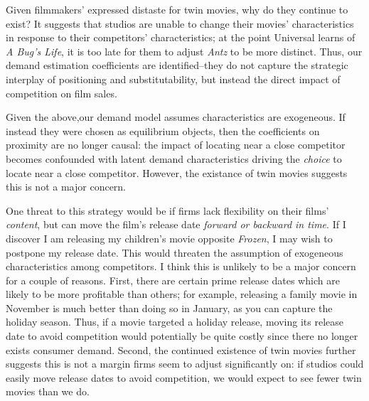 \documentclass{article}
\begin{document}
Given filmmakers' expressed distaste for twin movies, why do they continue to exist? It suggests that studios are unable to change their movies' characteristics in response to their competitors' characteristics; at the point Universal learns of \emph{A Bug's Life}, it is too late for them to adjust \emph{Antz} to be more distinct. Thus, our demand estimation coefficients are identified--they do not capture the strategic interplay of positioning and substitutability, but instead the direct impact of competition on film sales.

Given the above,our demand model assumes characteristics are exogeneous. If instead they were chosen as equilibrium objects, then the coefficients on proximity are no longer causal: the impact of locating near a close competitor becomes confounded with latent demand characteristics driving the \emph{choice} to locate near a close competitor. However, the existance of twin movies suggests this is not a major concern.




One threat to this strategy would be if firms lack flexibility on their films' \emph{content}, but can move the film's release date \emph{forward or backward in time}. If I discover I am releasing my children's movie opposite \emph{Frozen}, I may wish to postpone my release date. This would threaten the assumption of exogeneous characteristics among competitors. I think this is unlikely to be a major concern for a couple of reasons. First, there are certain prime release dates which are likely to be more profitable than others; for example, releasing a family movie in November is much better than doing so in January, as you can capture the holiday season. Thus, if a movie targeted a holiday release, moving its release date to avoid competition would potentially be quite costly since there no longer exists consumer demand. Second, the continued existence of twin movies further suggests this is not a margin firms seem to adjust significantly on: if studios could easily move release dates to avoid competition, we would expect to see fewer twin movies than we do. 
\end{document}

